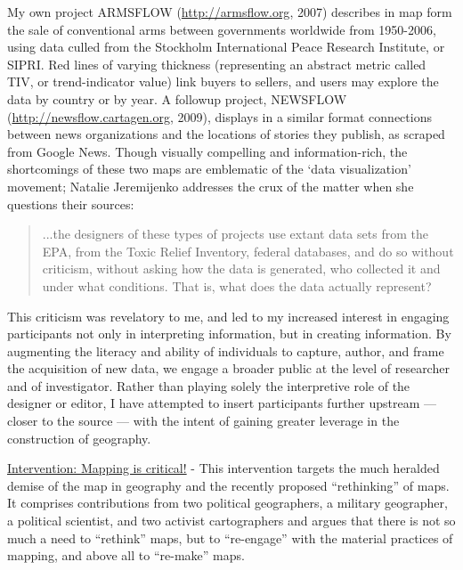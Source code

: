 \documentclass[11pt,oneside,notitlepage]{report}
\begin{document}
My own project ARMSFLOW (\url{http://armsflow.org}, 2007) describes in map form the sale of conventional arms between governments worldwide from 1950-2006, using data culled from the Stockholm International Peace Research Institute, or SIPRI. Red lines of varying thickness (representing an abstract metric called TIV, or trend-indicator value) link buyers to sellers, and users may explore the data by country or by year. A followup project, NEWSFLOW (\url{http://newsflow.cartagen.org}, 2009), displays in a similar format connections between news organizations and the locations of stories they publish, as scraped from Google News. Though visually compelling and information-rich, the shortcomings of these two maps are emblematic of the `data visualization' movement; Natalie Jeremijenko addresses the crux of the matter when she questions their sources: 

\begin{quote}
...the designers of these types of projects use extant data sets from the EPA, from the Toxic Relief Inventory, federal databases, and do so without criticism, without asking how the data is generated, who collected it and under what conditions. That is, what does the data actually represent? \cite{jeremijenko2008situated}
\end{quote}

This criticism was revelatory to me, and led to my increased interest in engaging participants not only in interpreting information, but in creating information. By augmenting the literacy and ability of individuals to capture, author, and frame the acquisition of new data, we engage a broader public at the level of researcher and of investigator. Rather than playing solely the interpretive role of the designer or editor, I have attempted to insert participants further upstream --- closer to the source --- with the intent of gaining greater leverage in the construction of geography. 

\href{http://www.sciencedirect.com/science?_ob=ArticleURL&_udi=B6VG2-4XHJX4B-1&_user=10&_coverDate=08/31/2009&_rdoc=1&_fmt=high&_orig=search&_sort=d&_docanchor=&view=c&_searchStrId=1186930669&_rerunOrigin=google&_acct=C000050221&_version=1&_urlVersion=0&_userid=10&md5=a9327ffa62e089e863f892a4551c1717}{Intervention: Mapping is critical!} - This intervention targets the much heralded demise of the map in geography and the recently proposed “rethinking” of maps. It comprises contributions from two political geographers, a military geographer, a political scientist, and two activist cartographers and argues that there is not so much a need to “rethink” maps, but to “re-engage” with the material practices of mapping, and above all to “re-make” maps.
\end{document}
